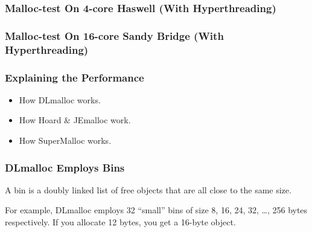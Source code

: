\documentclass[xcolor=dvipsnames,14pt]{beamer}
\begin{document}
\begin{frame}
\frametitle{Malloc-test On 4-core Haswell (With Hyperthreading)}


\end{frame}
\begin{frame}
\frametitle{Malloc-test On 16-core Sandy Bridge (With Hyperthreading)}


\end{frame}

\begin{frame}
\frametitle{Explaining the Performance}

\begin{itemize}
\item How DLmalloc works.
\item How Hoard \& JEmalloc work.
\item How SuperMalloc works.
\end{itemize}

\end{frame}

\begin{frame}
\frametitle{DLmalloc Employs Bins}
A bin is a doubly linked list of free objects that are all close to the same size.

\vfill

For example, DLmalloc employs 32 ``small'' bins of size 8, 16, 24, 32,
\ldots, 256 bytes respectively.  If you allocate 12 bytes, you get a 16-byte object.

\end{frame}
\end{document}
